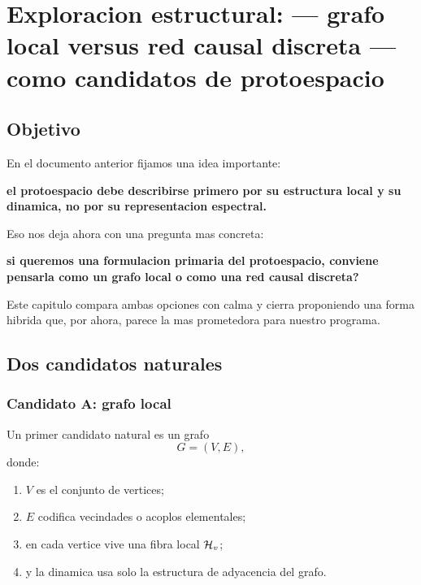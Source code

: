 \chapter{Exploracion estructural: --- grafo local versus red causal discreta --- como candidatos de protoespacio}
\label{ch:grafo-local-vs-red-causal}







\section{Objetivo}
En el documento anterior fijamos una idea importante:
\begin{displayquote}
\textbf{el protoespacio debe describirse primero por su estructura local y su dinamica, no por su representacion espectral.}
\end{displayquote}

Eso nos deja ahora con una pregunta mas concreta:
\begin{displayquote}
\textbf{si queremos una formulacion primaria del protoespacio, conviene pensarla como un grafo local o como una red causal discreta?}
\end{displayquote}

Este capitulo compara ambas opciones con calma y cierra proponiendo una forma hibrida que, por ahora, parece la mas prometedora para nuestro programa.

\section{Dos candidatos naturales}
\subsection{Candidato A: grafo local}
Un primer candidato natural es un grafo
\begin{equation}
G=(V,E),
\end{equation}
donde:
\begin{enumerate}[label=\arabic*.]
    \item \(V\) es el conjunto de vertices;
    \item \(E\) codifica vecindades o acoplos elementales;
    \item en cada vertice vive una fibra local \(\mathcal{H}_v\);
    \item y la dinamica usa solo la estructura de adyacencia del grafo.
\end{enumerate}


